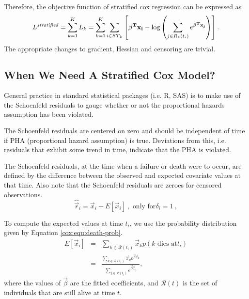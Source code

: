 Therefore, the objective function of stratified cox regression can be expressed as
\begin{equation}\label{cox:equ:stratified-obj}
L^{\mathit{stratified}} = \sum_{k=1}^{K} L_{k} = \sum_{k=1}^{K} \sum_{i \in \mathit{ST}_{k}} \left[  \bold{\beta^T x_i} - \log\left(\sum_{j \in R_k(t_i)} e^{\bold{\beta^T x_j} } \right) \right].
\end{equation}
The appropriate changes to gradient, Hessian and censoring are trivial.

\subsection{When We Need A Stratified Cox Model?}\label{cox:diagnostic}
General practice in standard statistical packages (i.e. R, SAS) is to
make use of the Schoenfeld residuals to gauge whether or not the
proportional hazards assumption has been violated.


The Schoenfeld residuals are centered on zero and should be
independent of time if PHA (proportional hazard assumption) is
true. Deviations from this, i.e. residuals that exhibit some trend in
time, indicate that the PHA is violated.

The Schoenfeld residuals, at the time when a failure or death were to occur, are
defined by the difference between the observed and expected covariate values at
that time. Also note that the Schoenfeld residuals are zeroes for censored
observations.
\begin{equation}
\hat{\vec{r}}_i = \vec{x}_i - E[\vec{x}_i]\ ,\mbox{ only for
}\delta_i=1\ ,
\end{equation}

To compute the expected values at time $t_{i}$, we use the probability distribution given by Equation \ref{cox:equ:death-prob}.
\begin{eqnarray}
E[\vec{x}_i] &=& \sum_{k\in \mathcal{R}(t_i)}\vec{x}_k p(k\mbox{ dies at
}t_i) \nonumber\\
&=& \frac{\sum_{k\in \mathcal{R}(t_i)}\vec{x}_k
  e^{\vec{\beta}\vec{x}_k}}{\sum_{j\in
    \mathcal{R}(t_i)}e^{\vec{\beta}\vec{x}_j} },
\end{eqnarray}
where the values of $\vec{\beta}$ are the fitted coefficients, and $\mathcal{R}(t)$ is the set of individuals that are still alive at time $t$.

